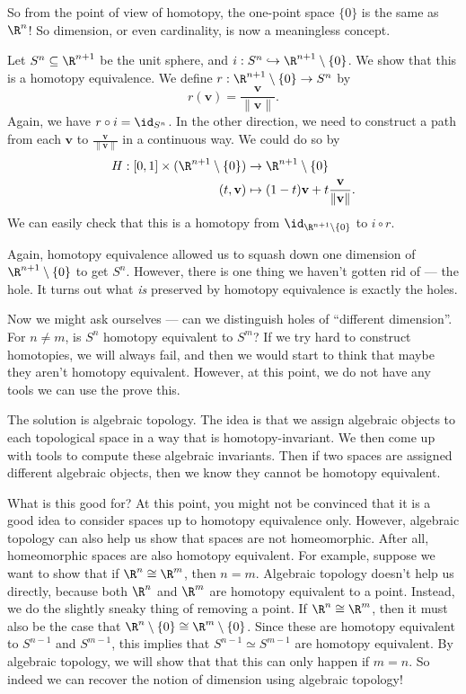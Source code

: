 \documentclass[a4paper]{article}
\begin{document}
So from the point of view of homotopy, the one-point space $\{0\}$ is the same as $\R^n$! So dimension, or even cardinality, is now a meaningless concept.

\begin{eg}
  Let $S^n \subseteq \R^{n + 1}$ be the unit sphere, and $i: S^n \hookrightarrow \R^{n + 1} \setminus \{0\}$. We show that this is a homotopy equivalence. We define $r: \R^{n + 1} \setminus \{0\} \to S^n$ by
  \[
    r(\mathbf{v}) = \frac{\mathbf{v}}{\|\mathbf{v}\|}.
  \]
  Again, we have $r \circ i = \id_{S^n}$. In the other direction, we need to construct a path from each $\mathbf{v}$ to $\frac{\mathbf{v}}{\|\mathbf{v}\|}$ in a continuous way. We could do so by
  \begin{align*}
    H: [0, 1] \times (\R^{n + 1} \setminus \{0\}) &\to \R^{n + 1} \setminus \{0\}\\
    (t, \mathbf{v}) &\mapsto (1 - t) \mathbf{v} + t \frac{\mathbf{v}}{\|\mathbf{v}\|}.
  \end{align*}
  We can easily check that this is a homotopy from $\id_{\R^{n + 1}\setminus \{0\}}$ to $i \circ r$.
\end{eg}

Again, homotopy equivalence allowed us to squash down one dimension of $\R^{n + 1} \setminus \{0\}$ to get $S^n$. However, there is one thing we haven't gotten rid of --- the hole. It turns out what \emph{is} preserved by homotopy equivalence is exactly the holes.

Now we might ask ourselves --- can we distinguish holes of ``different dimension''. For $n \not= m$, is $S^n$ homotopy equivalent to $S^m$? If we try hard to construct homotopies, we will always fail, and then we would start to think that maybe they aren't homotopy equivalent. However, at this point, we do not have any tools we can use the prove this.

The solution is algebraic topology. The idea is that we assign algebraic objects to each topological space in a way that is homotopy-invariant. We then come up with tools to compute these algebraic invariants. Then if two spaces are assigned different algebraic objects, then we know they cannot be homotopy equivalent.

What is this good for? At this point, you might not be convinced that it is a good idea to consider spaces up to homotopy equivalence only. However, algebraic topology can also help us show that spaces are not homeomorphic. After all, homeomorphic spaces are also homotopy equivalent. For example, suppose we want to show that if $\R^n \cong \R^m$, then $n = m$. Algebraic topology doesn't help us directly, because both $\R^n$ and $\R^m$ are homotopy equivalent to a point. Instead, we do the slightly sneaky thing of removing a point. If $\R^n \cong \R^m$, then it must also be the case that $\R^n \setminus \{0\} \cong \R^m \setminus \{0\}$. Since these are homotopy equivalent to $S^{n - 1}$ and $S^{m - 1}$, this implies that $S^{n - 1} \simeq S^{m - 1}$ are homotopy equivalent. By algebraic topology, we will show that that this can only happen if $m = n$. So indeed we can recover the notion of dimension using algebraic topology!
\end{document}
